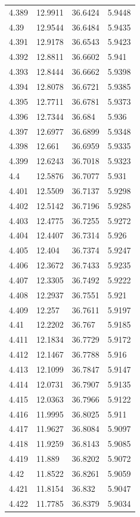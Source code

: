 \begin{tabular}{llll}
4.389 & 12.9911 & 36.6424 & 5.9448 \\
4.39 & 12.9544 & 36.6484 & 5.9435 \\
4.391 & 12.9178 & 36.6543 & 5.9423 \\
4.392 & 12.8811 & 36.6602 & 5.941 \\
4.393 & 12.8444 & 36.6662 & 5.9398 \\
4.394 & 12.8078 & 36.6721 & 5.9385 \\
4.395 & 12.7711 & 36.6781 & 5.9373 \\
4.396 & 12.7344 & 36.684 & 5.936 \\
4.397 & 12.6977 & 36.6899 & 5.9348 \\
4.398 & 12.661 & 36.6959 & 5.9335 \\
4.399 & 12.6243 & 36.7018 & 5.9323 \\
4.4 & 12.5876 & 36.7077 & 5.931 \\
4.401 & 12.5509 & 36.7137 & 5.9298 \\
4.402 & 12.5142 & 36.7196 & 5.9285 \\
4.403 & 12.4775 & 36.7255 & 5.9272 \\
4.404 & 12.4407 & 36.7314 & 5.926 \\
4.405 & 12.404 & 36.7374 & 5.9247 \\
4.406 & 12.3672 & 36.7433 & 5.9235 \\
4.407 & 12.3305 & 36.7492 & 5.9222 \\
4.408 & 12.2937 & 36.7551 & 5.921 \\
4.409 & 12.257 & 36.7611 & 5.9197 \\
4.41 & 12.2202 & 36.767 & 5.9185 \\
4.411 & 12.1834 & 36.7729 & 5.9172 \\
4.412 & 12.1467 & 36.7788 & 5.916 \\
4.413 & 12.1099 & 36.7847 & 5.9147 \\
4.414 & 12.0731 & 36.7907 & 5.9135 \\
4.415 & 12.0363 & 36.7966 & 5.9122 \\
4.416 & 11.9995 & 36.8025 & 5.911 \\
4.417 & 11.9627 & 36.8084 & 5.9097 \\
4.418 & 11.9259 & 36.8143 & 5.9085 \\
4.419 & 11.889 & 36.8202 & 5.9072 \\
4.42 & 11.8522 & 36.8261 & 5.9059 \\
4.421 & 11.8154 & 36.832 & 5.9047 \\
4.422 & 11.7785 & 36.8379 & 5.9034 \\

\end{tabular}
